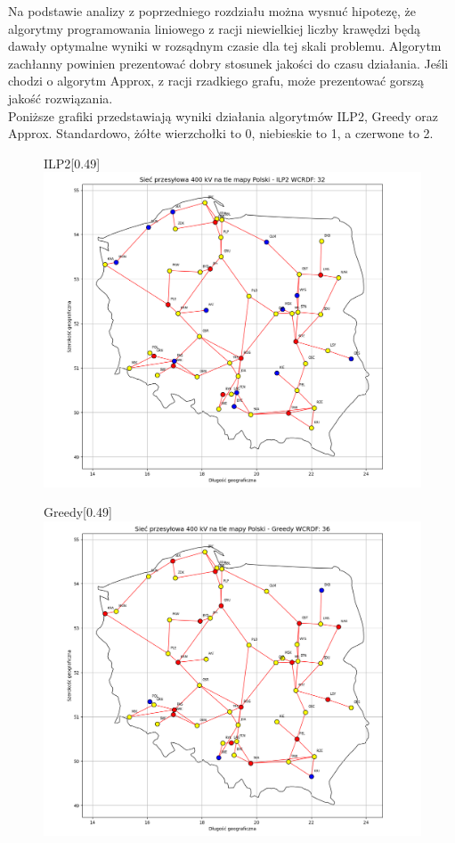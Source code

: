 Na podstawie analizy z poprzedniego rozdziału można wysnuć hipotezę, że algorytmy programowania liniowego z racji niewielkiej liczby krawędzi będą dawały optymalne wyniki w rozsądnym czasie dla tej skali problemu. Algorytm zachłanny powinien prezentować dobry stosunek jakości do czasu działania. Jeśli chodzi o algorytm Approx, z racji rzadkiego grafu, może prezentować gorszą jakość rozwiązania.\\

Poniższe grafiki przedstawiają wyniki działania algorytmów ILP2, Greedy oraz Approx. Standardowo, żółte wierzchołki to 0, niebieskie to 1, a czerwone to 2.

\begin{figure}[htbp]
    \centering
    \begin{subcaptionbox}{ILP2\label{fig:img}}[0.49\linewidth]
        {\includegraphics[width=\linewidth]{assets/Poland/img.png}}
    \end{subcaptionbox}
    \hfill
    \begin{subcaptionbox}{Greedy\label{fig:img2}}[0.49\linewidth]
        {\includegraphics[width=\linewidth]{assets/Poland/img_2.png}}

\end{subcaptionbox}
\end{figure}

